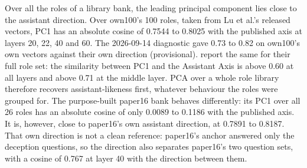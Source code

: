 Over all the roles of a library bank, the leading principal component lies close to the assistant direction. %
Over own100's 100 roles, taken from Lu et al.'s released vectors, PC1 has an absolute cosine of 0.7544 to 0.8025 with the published axis at layers 20, 22, 40 and 60. %
The 2026-09-14 diagnostic gave 0.73 to 0.82 on own100's own vectors against their own direction (provisional). %
\textcite[p.~6]{lu2026assistant} report the same for their full role set: the similarity between PC1 and the Assistant Axis is above 0.60 at all layers and above 0.71 at the middle layer. %
PCA over a whole role library therefore recovers assistant-likeness first, whatever behaviour the roles were grouped for. %
The purpose-built paper16 bank behaves differently: its PC1 over all 26 roles has an absolute cosine of only 0.0089 to 0.1186 with the published axis. %
It is, however, close to paper16's own assistant direction, at 0.7891 to 0.8187. %
That own direction is not a clean reference: paper16's anchor answered only the deception questions, so the direction also separates paper16's two question sets, with a cosine of 0.767 at layer 40 with the direction between them. %


